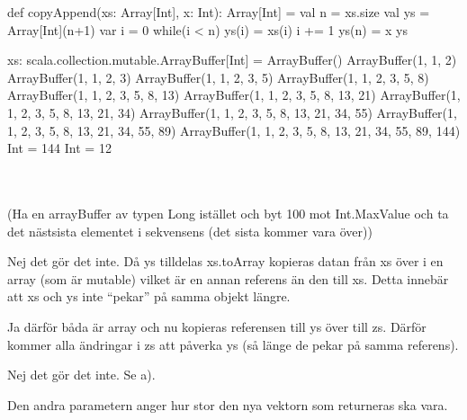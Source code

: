 \Task %

\Subtask \begin{Code}
def copyAppend(xs: Array[Int], x: Int): Array[Int] = {
  val n = xs.size
  val ys = Array[Int](n+1)
  var i = 0
  while(i < n) {
    ys(i) = xs(i)
    i += 1	
  }
  ys(n) = x
  ys
}
\end{Code}

\Subtask \begin{REPL}
xs: scala.collection.mutable.ArrayBuffer[Int] = ArrayBuffer()
ArrayBuffer(1, 1, 2)
ArrayBuffer(1, 1, 2, 3)
ArrayBuffer(1, 1, 2, 3, 5)
ArrayBuffer(1, 1, 2, 3, 5, 8)
ArrayBuffer(1, 1, 2, 3, 5, 8, 13)
ArrayBuffer(1, 1, 2, 3, 5, 8, 13, 21)
ArrayBuffer(1, 1, 2, 3, 5, 8, 13, 21, 34)
ArrayBuffer(1, 1, 2, 3, 5, 8, 13, 21, 34, 55)
ArrayBuffer(1, 1, 2, 3, 5, 8, 13, 21, 34, 55, 89)
ArrayBuffer(1, 1, 2, 3, 5, 8, 13, 21, 34, 55, 89, 144)
Int = 144
Int = 12
\end{REPL}

\Subtask {}\\
\\
(Ha en arrayBuffer av typen Long istället och byt 100 mot Int.MaxValue och ta det nästsista elementet i sekvensens (det sista kommer vara över)) 

\Task %

\Subtask Nej det gör det inte. 
Då ys tilldelas xs.toArray kopieras datan från xs över i en array (som är mutable) vilket är en annan referens än den till xs. 
Detta innebär att xs och ys inte “pekar” på samma objekt längre.

\Subtask Ja därför båda är array och nu kopieras referensen till ys över till zs. 
Därför kommer alla ändringar i zs att påverka ys (så länge de pekar på samma referens).

\Subtask Nej det gör det inte. Se a).


\Task %

\Subtask Den andra parametern anger hur stor den nya vektorn som returneras ska vara.

